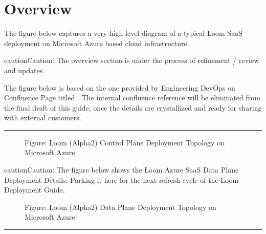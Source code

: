\documentclass[letterpaper,10pt,english]{sphinxmanual}
\begin{document}
\section{Overview}
\label{\detokenize{loom_installation_guide:content-azure-dep-oview}}\label{\detokenize{loom_installation_guide:overview}}
The figure below captures a very high level diagram of a typical Loom SaaS deployment on Microsoft Azure based cloud infrastructure.

\begin{sphinxadmonition}{caution}{Caution:}
The overview section is under the process of refinement / review and updates.

The figure below is based on the one provided by Engineering DevOps on Confluence Page titled . The internal confluence reference will be eliminated from the final draft of this guide, once the details are crystallized and ready for sharing with external customers.
\end{sphinxadmonition}


\bigskip\hrule\bigskip


\begin{figure}[htbp]
\centering
\capstart

\noindent{}
\caption{Figure: Loom (Alpha2) Control Plane Deployment Topology on Microsoft Azure}\label{\detokenize{loom_installation_guide:id3}}\end{figure}

\begin{sphinxadmonition}{caution}{Caution:}
The figure below shows the Loom Azure SaaS Data Plane Deployment Details.  Parking it here for the next refresh cycle of the Loom Deployment Guide.
\end{sphinxadmonition}

\begin{figure}[htbp]
\centering
\capstart

\noindent{}
\caption{Figure: Loom (Alpha2) Data Plane Deployment Topology on Microsoft Azure}\label{\detokenize{loom_installation_guide:id4}}\end{figure}


\bigskip\hrule\bigskip
\end{document}
